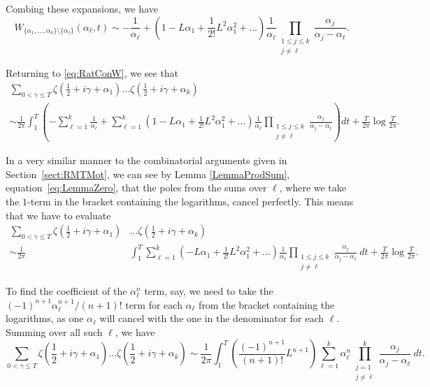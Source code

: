 \documentclass[12pt,a4paper,reqno]{amsart}
\theoremstyle{remark}
\numberwithin{equation}{section}
\begin{document}
Combing these expansions, we have 
\begin{equation*}
W_{\{\alpha_1,\dots,\alpha_k\}\setminus \{ \alpha_\ell \}}(\alpha_\ell,t) \sim -\frac{1}{\alpha_\ell} + \left(1 - L \alpha_1 + \frac{1}{2!} L^2 \alpha_1^2 + \dots \right) \frac{1}{\alpha_\ell} \prod_{\substack{1\leq j \leq k \\ j \neq \ell}} \frac{\alpha_j}{\alpha_j-\alpha_\ell}.
\end{equation*}


Returning to \eqref{eq:RatConW}, we see that
\begin{multline*}
\sum_{0 < \gamma \leq T} \zeta \left( \frac{1}{2} + i \gamma + \alpha_1 \right)\dots\zeta \left( \frac{1}{2} + i \gamma + \alpha_k \right) \\
\sim  \frac{1}{2 \pi} \int_{1}^{T} \left( - \sum_{\ell=1}^k \frac{1}{\alpha_\ell} + \sum_{\ell=1}^k \left(1 - L \alpha_1 + \frac{1}{2!} L^2 \alpha_1^2 + \dots \right) \frac{1}{\alpha_\ell} \prod_{\substack{1\leq j \leq k \\ j \neq \ell}} \frac{\alpha_j}{\alpha_j-\alpha_\ell} \right) dt + \frac{T}{2\pi} \log\frac{T}{2\pi}.
\end{multline*}

In a very similar manner to the combinatorial arguments given in Section~\ref{sect:RMTMot}, we can see by Lemma \ref{LemmaProdSum}, equation~\eqref{eq:LemmaZero}, that the poles from the sums over $\ell$, where we take the $1$-term in the bracket containing the logarithms, cancel perfectly. This means that we have to evaluate
\begin{align*}
\sum_{0 < \gamma \leq T}  \zeta \left( \frac{1}{2} + i \gamma + \alpha_1 \right)&\dots\zeta \left( \frac{1}{2} + i \gamma + \alpha_k \right) \\
\sim  \frac{1}{2 \pi}& \int_{1}^{T} \sum_{\ell=1}^k \left( - L \alpha_1 + \frac{1}{2!} L^2 \alpha_1^2 + \dots \right) \frac{1}{\alpha_\ell} \prod_{\substack{1\leq j \leq k \\ j \neq \ell}} \frac{\alpha_j}{\alpha_j-\alpha_\ell} \ dt + \frac{T}{2\pi} \log\frac{T}{2\pi}.
\end{align*}

To find the coefficient of the $\alpha_\ell^n$ term, say, we need to take the $(-1)^{n+1}\alpha_\ell^{n+1}/(n+1)!$ term for each $\alpha_\ell$ from the bracket containing the logarithms, as one $\alpha_\ell$ will cancel with the one in the denominator for each $\ell$. Summing over all such $\ell$, we have
\begin{equation*}
\sum_{0 < \gamma \leq T}  \zeta \left( \frac{1}{2} + i \gamma + \alpha_1 \right)\dots\zeta \left( \frac{1}{2} + i \gamma + \alpha_k \right)
\sim \frac{1}{2 \pi} \int_{1}^{T} \left( \frac{(-1)^{n+1}}{(n+1)!} L^{n+1} \right) \sum_{\ell=1}^k \alpha_\ell^n \prod_{ \substack{j=1 \\ j \neq \ell}}^{k} \frac{\alpha_j}{\alpha_j-\alpha_\ell} \ dt.
\end{equation*}
\end{document}
